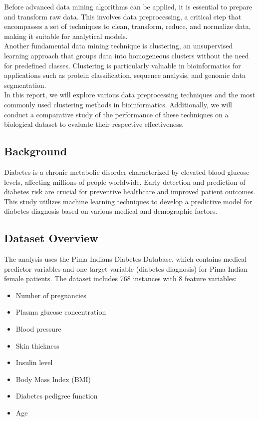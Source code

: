 \documentclass[a4paper,12pt]{article}
\begin{document}
Before advanced data mining algorithms can be applied, it is essential to prepare and transform raw data. This involves data preprocessing, a critical step that encompasses a set of techniques to clean, transform, reduce, and normalize data, making it suitable for analytical models.\\

Another fundamental data mining technique is clustering, an unsupervised learning approach that groups data into homogeneous clusters without the need for predefined classes. Clustering is particularly valuable in bioinformatics for applications such as protein classification, sequence analysis, and genomic data segmentation.\\

In this report, we will explore various data preprocessing techniques and the most commonly used clustering methods in bioinformatics. Additionally, we will conduct a comparative study of the performance of these techniques on a biological dataset to evaluate their respective effectiveness.

\subsection{Background}
Diabetes is a chronic metabolic disorder characterized by elevated blood glucose levels, affecting millions of people worldwide. Early detection and prediction of diabetes risk are crucial for preventive healthcare and improved patient outcomes. This study utilizes machine learning techniques to develop a predictive model for diabetes diagnosis based on various medical and demographic factors.

\subsection{Dataset Overview}
The analysis uses the Pima Indians Diabetes Database, which contains medical predictor variables and one target variable (diabetes diagnosis) for Pima Indian female patients. The dataset includes 768 instances with 8 feature variables:
\begin{itemize}
    \item{Number of pregnancies}
    \item{Plasma glucose concentration}
    \item{Blood pressure}
    \item{Skin thickness}
    \item{Insulin level}
    \item{Body Mass Index (BMI)}
    \item{Diabetes pedigree function}
    \item{Age}
\end{itemize}
\end{document}
